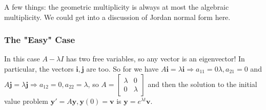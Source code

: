 \documentclass[letterpaper, 11pt, openany]{book}
\theoremstyle{mytheoremstyle}
\theoremstyle{myexamplestyle}
\begin{document}
A few things: the geometric multiplicity is always at most the algebraic multiplicity. We could get into a discussion of Jordan normal form here.

\subsubsection{The "Easy" Case}
In this case \(A - \lambda I\) has two free variables, so any vector is an eigenvector! In particular, the vectors \(\mathbf{i}, \mathbf{j}\) are too. So for we have \(A \mathbf{i} = \lambda \mathbf{i} \Rightarrow a_{11} = 0 \lambda, a_{21} = 0\) and \(A \mathbf{j} = \lambda \mathbf{j} \Rightarrow a_{12}= 0, a_{22} = \lambda\), so \(A = \begin{bmatrix}
    \lambda & 0 \\ 0 & \lambda
\end{bmatrix}\) and then the solution to the initial value problem \(\mathbf{y}' = A \mathbf{y}, \mathbf{y}(0) = \mathbf{v}\) is \(\mathbf{y} = e^{\lambda t} \mathbf{v}\).
\end{document}
